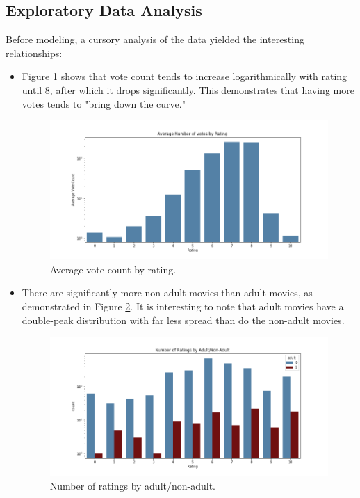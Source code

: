 \documentclass[12pt, oneside]{article}   	%
\begin{document}
\subsection{Exploratory Data Analysis}

Before modeling, a cursory analysis of the data yielded the interesting relationships:

\begin{itemize}

\item Figure \ref{fig:vote_count_by_rating} shows that vote count tends to increase logarithmically with rating until 8, after which it drops significantly. This demonstrates that having more votes tends to "bring down the curve."

\begin{figure}%
\includegraphics[width=\textwidth]{vote_count_by_rating}
\caption{\label{fig:vote_count_by_rating}Average vote count by rating.}
\end{figure}

\item There are significantly more non-adult movies than adult movies, as demonstrated in Figure \ref{fig:ratings_by_adult}. It is interesting to note that adult movies have a double-peak distribution with far less spread than do the non-adult movies.

\begin{figure}%
\includegraphics[width=\textwidth]{ratings_by_adult}
\caption{\label{fig:ratings_by_adult}Number of ratings by adult/non-adult.}
\end{figure}


\end{itemize}
\end{document}
